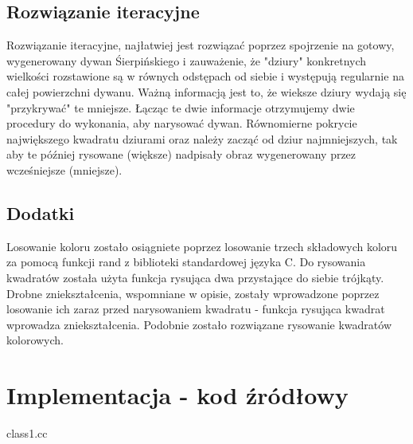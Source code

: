 \documentclass[polish,polish,a4paper]{article}
\begin{document}
\subsection{Rozwiązanie iteracyjne}
Rozwiązanie iteracyjne, najłatwiej jest rozwiązać poprzez spojrzenie na gotowy, wygenerowany dywan Śierpińskiego i zauważenie, że "dziury" konkretnych
wielkości rozstawione są w równych odstępach od siebie i występują regularnie na całej powierzchni dywanu. Ważną informacją jest to, że wieksze dziury
wydają się "przykrywać" te mniejsze. Łącząc te dwie informacje otrzymujemy dwie procedury do wykonania, aby narysować dywan. Równomierne pokrycie 
największego kwadratu dziurami oraz należy zacząć od dziur najmniejszych, tak aby te później rysowane (większe) nadpisały obraz wygenerowany przez
wcześniejsze (mniejsze).

\subsection{Dodatki}
Losowanie koloru zostało osiągniete poprzez losowanie trzech składowych koloru za pomocą funkcji rand z biblioteki standardowej języka C.
Do rysowania kwadratów została użyta funkcja rysująca dwa przystające do siebie trójkąty. Drobne zniekształcenia, wspomniane w opisie, zostały wprowadzone
poprzez losowanie ich zaraz przed narysowaniem kwadratu - funkcja rysująca kwadrat wprowadza zniekształcenia. Podobnie zostało rozwiązane rysowanie
kwadratów kolorowych.

\pagebreak
\section{Implementacja - kod źródłowy}

{class1.cc}
\pagebreak



\end{document}
